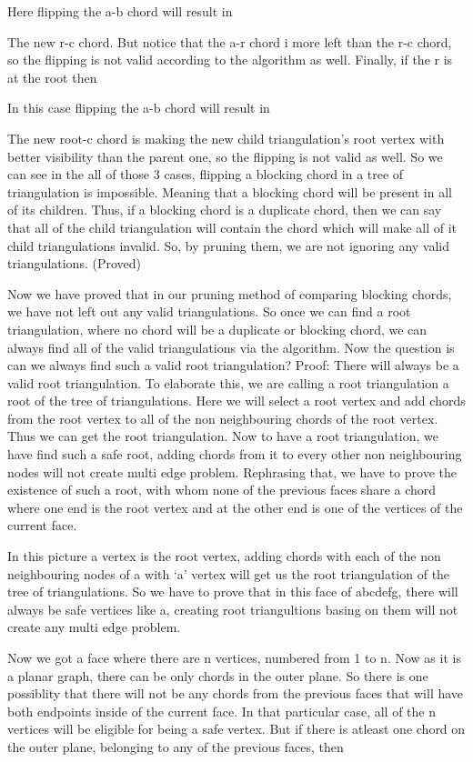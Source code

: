 \documentclass[12pt,a4paper]{article}
\begin{document}
Here flipping the a-b chord will result in 

The new r-c chord. But notice that the a-r chord i more left than the r-c chord, so the flipping is not valid according to the algorithm as well.
Finally, if the r is at the root then

In this case flipping the a-b chord will result in 

The new root-c chord is making the new child triangulation’s root vertex with better visibility than the parent one, so the flipping is not valid as well.
So we can see in the all of those 3 cases, flipping a blocking chord in a tree of triangulation is impossible. Meaning that a blocking chord will be present in all of its children. 
Thus, if a blocking chord is a duplicate chord, then we can say that all of the child triangulation will contain the chord which will make all of it child triangulations invalid.
So, by pruning them, we are not ignoring any valid triangulations. (Proved)

Now we have proved that in our pruning method of comparing blocking chords, we have not left out any valid triangulations. 
So once we can find a root triangulation, where no chord will be a duplicate or blocking chord, we can always find all of the valid triangulations via the algorithm. Now the question is can we always find such a valid root triangulation?
Proof: There will always be a valid root triangulation.
To elaborate this, we are calling  a root triangulation a root of the tree of triangulations. Here we will select a root vertex and add chords from the root vertex to all of the non neighbouring chords of the root vertex. Thus we can get the root triangulation.
Now to have a root triangulation, we have find such a safe root, adding chords from it to every other non neighbouring nodes will not create multi edge problem.
Rephrasing that, we have to prove the existence of such a root, with whom none of the previous faces share a chord where one end is the root vertex and at the other end is one of the vertices of the current face.

In this picture a vertex is the root vertex, adding chords with each of the non neighbouring nodes of a with ‘a’ vertex will get us the root triangulation of the tree of triangulations.
So we have to prove that in this face of abcdefg, there will always be safe vertices like a, creating root triangultions basing on them will not create any multi edge problem. 

Now we got a face where there are n vertices, numbered from 1 to n. Now as it is a planar graph, there can be only chords in the outer plane. So there is one possiblity that there will not be any chords from the previous faces that will have both endpoints inside of the current face. In that particular case, all of the n vertices will be eligible for being a safe vertex.
But if there is atleast one chord on the outer plane, belonging to any of the previous faces, then
\end{document}
